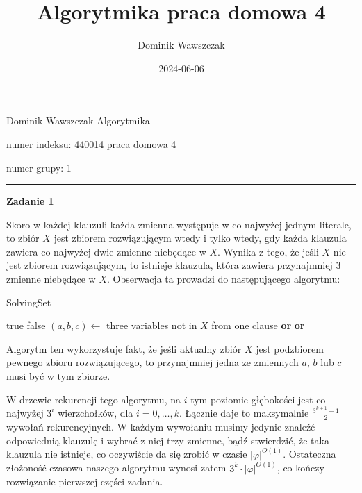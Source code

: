 \documentclass[12pt]{article}
\title{Algorytmika praca domowa 4}
\author{Dominik Wawszczak}
\date{2024-06-06}
\begin{document}
	\setlength{\parindent}{0 cm}
	
	Dominik Wawszczak \hfill Algorytmika
	
	numer indeksu: 440014 \hfill praca domowa 4
	
	numer grupy: 1
	
	\bigskip
	\hrule
	\bigskip
	
	\textbf{Zadanie 1}
	
	\medskip
	
	Skoro w każdej klauzuli każda zmienna występuje w co najwyżej jednym
	literale, to zbiór \(X\) jest zbiorem rozwiązującym wtedy i tylko wtedy, gdy
	każda klauzula zawiera co najwyżej dwie zmienne niebędące w \(X\). Wynika z
	tego, że jeśli \(X\) nie jest zbiorem rozwiązującym, to istnieje klauzula,
	która zawiera przynajmniej \(3\) zmienne niebędące w \(X\). Obserwacja ta
	prowadzi do następującego algorytmu:
	
	\begin{algorithm}
		\caption{SolvingSet}
		\begin{algorithmic}[1]
			        \State \Return true
			    \EndIf
			        \State \Return false
			    \EndIf
			    \State $(a, b, c) \gets$ three variables not in $X$ from one
			    clause
			    \State \Return {}
			    \textbf{or}  \textbf{or}
			    \Statex \hspace{4.65em} 
		\EndProcedure
		\end{algorithmic}
	\end{algorithm}
	
	Algorytm ten wykorzystuje fakt, że jeśli aktualny zbiór \(X\) jest
	podzbiorem pewnego zbioru rozwiązującego, to przynajmniej jedna ze zmiennych
	\(a\), \(b\) lub \(c\) musi być w tym zbiorze.
	
	\medskip
	
	W drzewie rekurencji tego algorytmu, na \(i\)-tym poziomie głębokości jest
	co najwyżej \(3^{i}\) wierzchołków, dla \(i = 0, \ldots, k\). Łącznie
	daje to maksymalnie \(\frac{3^{k + 1} - 1}{2}\) wywołań rekurencyjnych. W
	każdym wywołaniu musimy jedynie znaleźć odpowiednią klauzulę i wybrać z niej
	trzy zmienne, bądź stwierdzić, że taka klauzula nie istnieje, co oczywiście
	da się zrobić w czasie \(|\varphi|^{O(1)}\). Ostateczna złożoność czasowa
	naszego algorytmu wynosi zatem \(3^{k} \cdot |\varphi|^{O(1)}\), co kończy
	rozwiązanie pierwszej części zadania.
\end{document}
